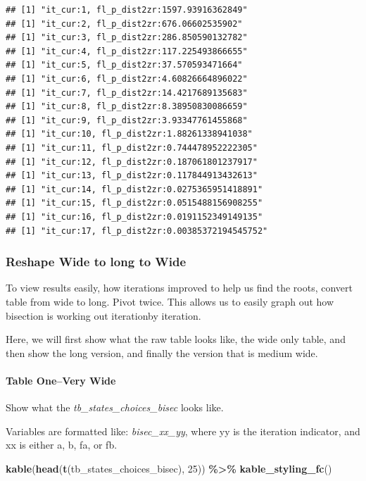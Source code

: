 \documentclass[
]{book}
\newenvironment{Shaded}{\begin{snugshade}}{\end{snugshade}}
\newcommand{\DecValTok}[1]{\textcolor[rgb]{0.00,0.00,0.81}{#1}}
\newcommand{\KeywordTok}[1]{\textcolor[rgb]{0.13,0.29,0.53}{\textbf{#1}}}
\newcommand{\NormalTok}[1]{#1}
\newcommand{\OperatorTok}[1]{\textcolor[rgb]{0.81,0.36,0.00}{\textbf{#1}}}
\newcommand{\StringTok}[1]{\textcolor[rgb]{0.31,0.60,0.02}{#1}}
\begin{document}
\begin{verbatim}
## [1] "it_cur:1, fl_p_dist2zr:1597.93916362849"
## [1] "it_cur:2, fl_p_dist2zr:676.06602535902"
## [1] "it_cur:3, fl_p_dist2zr:286.850590132782"
## [1] "it_cur:4, fl_p_dist2zr:117.225493866655"
## [1] "it_cur:5, fl_p_dist2zr:37.570593471664"
## [1] "it_cur:6, fl_p_dist2zr:4.60826664896022"
## [1] "it_cur:7, fl_p_dist2zr:14.4217689135683"
## [1] "it_cur:8, fl_p_dist2zr:8.38950830086659"
## [1] "it_cur:9, fl_p_dist2zr:3.93347761455868"
## [1] "it_cur:10, fl_p_dist2zr:1.88261338941038"
## [1] "it_cur:11, fl_p_dist2zr:0.744478952222305"
## [1] "it_cur:12, fl_p_dist2zr:0.187061801237917"
## [1] "it_cur:13, fl_p_dist2zr:0.117844913432613"
## [1] "it_cur:14, fl_p_dist2zr:0.0275365951418891"
## [1] "it_cur:15, fl_p_dist2zr:0.0515488156908255"
## [1] "it_cur:16, fl_p_dist2zr:0.0191152349149135"
## [1] "it_cur:17, fl_p_dist2zr:0.00385372194545752"
\end{verbatim}

\hypertarget{reshape-wide-to-long-to-wide}{%
\subsubsection{Reshape Wide to long to Wide}\label{reshape-wide-to-long-to-wide}}

To view results easily, how iterations improved to help us find the roots, convert table from wide to long. Pivot twice. This allows us to easily graph out how bisection is working out iterationby iteration.

Here, we will first show what the raw table looks like, the wide only table, and then show the long version, and finally the version that is medium wide.

\hypertarget{table-onevery-wide}{%
\paragraph{Table One--Very Wide}\label{table-onevery-wide}}

Show what the \emph{tb\_states\_choices\_bisec} looks like.

Variables are formatted like: \emph{bisec\_xx\_yy}, where yy is the iteration indicator, and xx is either a, b, fa, or fb.

\begin{Shaded}
\begin{Highlighting}[]
\KeywordTok{kable}\NormalTok{(}\KeywordTok{head}\NormalTok{(}\KeywordTok{t}\NormalTok{(tb\_states\_choices\_bisec), }\DecValTok{25}\NormalTok{)) }\OperatorTok{\%\textgreater{}\%}\StringTok{ }
\StringTok{  }\KeywordTok{kable\_styling\_fc}\NormalTok{()}
\end{Highlighting}
\end{Shaded}
\end{document}
